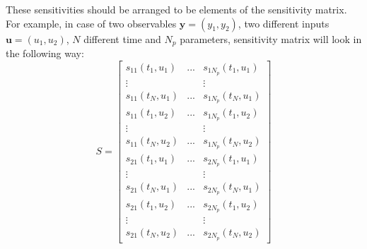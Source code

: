 \documentclass[10pt,A4paper]{article}
\newcommand{\mbu}{\mathbf{u}}
\newcommand{\mby}{\mathbf{y}}
\begin{document}
These sensitivities should be arranged to be elements of the sensitivity matrix.
For example, in case of two observables $\mby = (y_1, y_2)$, two different inputs $\mbu = (u_1, u_2)$, $N$ different time and $N_p$ parameters, sensitivity matrix will look in the following way:
\begin{equation}
    S = 
\begin{bmatrix}
s_{11} (t_1, u_1) & ... & s_{1 N_p}(t_1, u_1) \\
\vdots  &   & \vdots  \\
s_{11} (t_{N}, u_1) & ... & s_{1 N_p} (t_{N}, u_1)\\
s_{11} (t_1, u_2) & ... & s_{1 N_p}(t_1, u_2) \\
\vdots  &   & \vdots  \\
s_{11} (t_N, u_2) & ... & s_{1 N_p} (t_N, u_2)\\

s_{21} (t_1, u_1) & ... & s_{2 N_p}(t_1, u_1) \\
\vdots  &   & \vdots  \\
s_{21} (t_{N}, u_1) & ... & s_{2 N_p} (t_{N}, u_1)\\
s_{21} (t_1, u_2) & ... & s_{2 N_p}(t_1, u_2) \\
\vdots  &   & \vdots  \\
s_{21} (t_N, u_2) & ... & s_{2 N_p} (t_N, u_2)
\end{bmatrix}
\label{eq:sens_matrix}
\end{equation}
\end{document}
